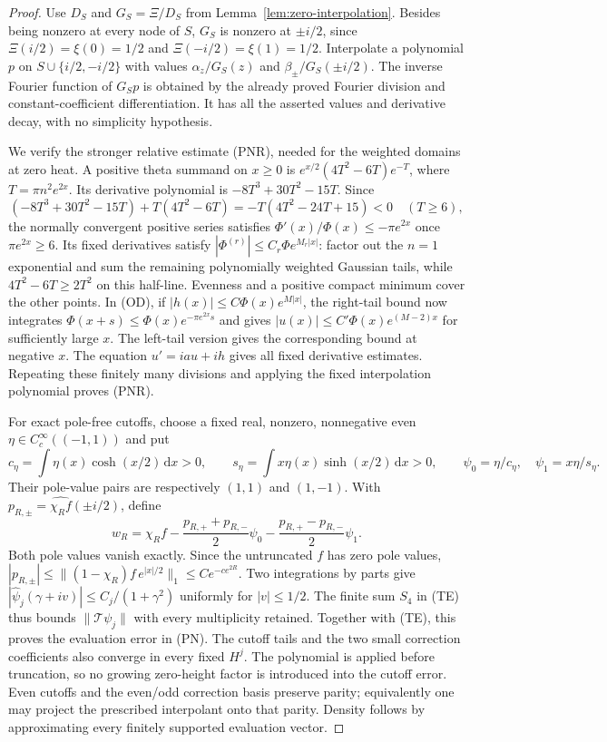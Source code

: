 \documentclass[11pt]{article}
\theoremstyle{remark}\newtheorem{remark}[theorem]{Remark}
\newcommand{\dd}{\,\mathrm d}
\begin{document}
\begin{proof}
Use $D_S$ and $G_S=\Xi/D_S$ from
Lemma~\ref{lem:zero-interpolation}. Besides being nonzero at
every node of $S$, $G_S$ is nonzero at $\pm i/2$, since
$\Xi(i/2)=\xi(0)=1/2$ and $\Xi(-i/2)=\xi(1)=1/2$.
Interpolate a polynomial $p$ on $S\cup\{i/2,-i/2\}$ with
values $\alpha_z/G_S(z)$ and $\beta_\pm/G_S(\pm i/2)$.
The inverse Fourier function of $G_Sp$ is obtained by the
already proved Fourier division and constant-coefficient
differentiation. It has all the asserted values and derivative
decay, with no simplicity hypothesis.

We verify the stronger relative estimate (PNR), needed for the
weighted domains at zero heat. A positive theta summand on $x\ge0$
is $e^{x/2}(4T^2-6T)e^{-T}$, where $T=\pi n^2e^{2x}$.
Its derivative polynomial is $-8T^3+30T^2-15T$.
Since
\[
 (-8T^3+30T^2-15T)+T(4T^2-6T)
       =-T(4T^2-24T+15)<0\quad(T\ge6),
\]
the normally convergent positive series satisfies
$\Phi'(x)/\Phi(x)\le-\pi e^{2x}$ once $\pi e^{2x}\ge6$.
Its fixed derivatives satisfy
$|\Phi^{(r)}|\le C_r\Phi e^{M_r|x|}$: factor out the
$n=1$ exponential and sum the remaining polynomially weighted
Gaussian tails, while $4T^2-6T\ge2T^2$ on this half-line.
Evenness and a positive compact minimum cover the other points.
In (OD), if $|h(x)|\le C\Phi(x)e^{M|x|}$, the right-tail
bound now integrates
$\Phi(x+s)\le\Phi(x)e^{-\pi e^{2x}s}$ and gives
$|u(x)|\le C'\Phi(x)e^{(M-2)x}$ for sufficiently large $x$.
The left-tail version gives the corresponding bound at negative
$x$. The equation $u'=iau+ih$ gives all fixed derivative
estimates. Repeating these finitely many divisions and applying
the fixed interpolation polynomial proves (PNR).

For exact pole-free cutoffs, choose a fixed real, nonzero,
nonnegative even $\eta\in C_c^\infty((-1,1))$ and put
\[
 c_\eta=\int\eta(x)\cosh(x/2)\dd x>0,\qquad
 s_\eta=\int x\eta(x)\sinh(x/2)\dd x>0,\qquad
 \psi_0=\eta/c_\eta,\quad \psi_1=x\eta/s_\eta.
\]
Their pole-value pairs are respectively $(1,1)$ and $(1,-1)$.
With $p_{R,\pm}=\widehat{\chi_R f}(\pm i/2)$, define
\[
 w_R=\chi_R f-\frac{p_{R,+}+p_{R,-}}2\psi_0
                   -\frac{p_{R,+}-p_{R,-}}2\psi_1.
                                                               \tag{PC}
\]
Both pole values vanish exactly. Since the untruncated $f$
has zero pole values,
$|p_{R,\pm}|\le\|(1-\chi_R)f\,e^{|x|/2}\|_1
\le C e^{-c e^{2R}}$.
Two integrations by parts give
$|\widehat\psi_j(\gamma+iv)|\le C_j/(1+\gamma^2)$
uniformly for $|v|\le1/2$.
The finite sum $S_4$ in (TE) thus bounds
$\|\mathcal T\psi_j\|$ with every multiplicity retained.
Together with (TE), this proves the evaluation error in (PN).
The cutoff tails and the two small correction coefficients
also converge in every fixed $H^j$.
The polynomial is applied before truncation, so no growing
zero-height factor is introduced into the cutoff error.
Even cutoffs and the even/odd correction basis preserve parity;
equivalently one may project the prescribed interpolant onto
that parity. Density follows by approximating every finitely
supported evaluation vector.
\end{proof}
\end{document}
